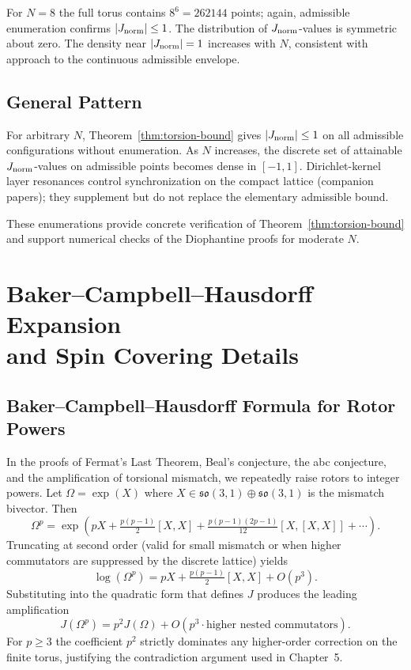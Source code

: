 \documentclass[dvipdfmx,a4paper]{article}
\theoremstyle{definition}
\theoremstyle{remark}
\newcommand{\Jnorm}{J_{\rm norm}}
\begin{document}
For \( N = 8 \) the full torus contains \( 8^6 = 262144 \) points; again, admissible enumeration confirms \(|\Jnorm| \leq 1\). The distribution of \(\Jnorm\)-values is symmetric about zero. The density near \(|\Jnorm| = 1\) increases with \( N \), consistent with approach to the continuous admissible envelope.

\subsection{General Pattern}

For arbitrary \( N \), Theorem~\ref{thm:torsion-bound} gives \(|\Jnorm| \leq 1\) on all admissible configurations without enumeration. As \( N \) increases, the discrete set of attainable \(\Jnorm\)-values on admissible points becomes dense in \([-1,1]\). Dirichlet-kernel layer resonances control synchronization on the compact lattice (companion papers); they supplement but do not replace the elementary admissible bound.

These enumerations provide concrete verification of Theorem~\ref{thm:torsion-bound} and support numerical checks of the Diophantine proofs for moderate \( N \).

\section[Baker--Campbell--Hausdorff expansion and spin covering]{Baker--Campbell--Hausdorff Expansion\\ and Spin Covering Details}

\subsection{Baker--Campbell--Hausdorff Formula for Rotor Powers}

In the proofs of Fermat’s Last Theorem, Beal’s conjecture, the abc conjecture, and the amplification of torsional mismatch, we repeatedly raise rotors to integer powers. Let \( \Omega = \exp(X) \) where \( X \in \mathfrak{so}(3,1) \oplus \mathfrak{so}(3,1) \) is the mismatch bivector. Then
\[
\Omega^p = \exp(pX + \tfrac{p(p-1)}{2}[X,X] + \tfrac{p(p-1)(2p-1)}{12}[X,[X,X]] + \cdots).
\]
Truncating at second order (valid for small mismatch or when higher commutators are suppressed by the discrete lattice) yields
\[
\log(\Omega^p) = pX + \tfrac{p(p-1)}{2}[X,X] + O(p^3).
\]
Substituting into the quadratic form that defines \( J \) produces the leading amplification
\[
J(\Omega^p) = p^2 J(\Omega) + O(p^3 \cdot \text{higher nested commutators}).
\]
For \( p \geq 3 \) the coefficient \( p^2 \) strictly dominates any higher-order correction on the finite torus, justifying the contradiction argument used in Chapter~5.
\end{document}
